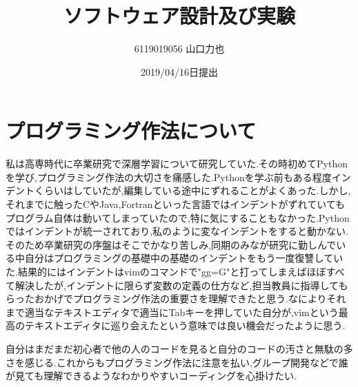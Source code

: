\documentclass{jarticle}
\title{ソフトウェア設計及び実験\\}
\author{6119019056 山口力也}
\date{2019/04/16日提出}
\begin{document}
\maketitle
\section{プログラミング作法について}
私は高専時代に卒業研究で深層学習について研究していた.その時初めてPythonを学び,プログラミング作法の大切さを痛感した.Pythonを学ぶ前もある程度インデントくらいはしていたが,編集している途中にずれることがよくあった.しかし,それまでに触ったCやJava,Fortranといった言語ではインデントがずれていてもプログラム自体は動いてしまっていたので,特に気にすることもなかった.Pythonではインデントが統一されており,私のように変なインデントをすると動かない.そのため卒業研究の序盤はそこでかなり苦しみ,同期のみなが研究に勤しんでいる中自分はプログラミングの基礎中の基礎のインデントをもう一度復讐していた.結果的にはインデントはvimのコマンドで"gg=G"と打ってしまえばほぼすべて解決したが,インデントに限らず変数の定義の仕方など,担当教員に指導してもらったおかげでプログラミング作法の重要さを理解できたと思う.なによりそれまで適当なテキストエディタで適当にTabキーを押していた自分が,vimという最高のテキストエディタに巡り会えたという意味では良い機会だったように思う.

自分はまだまだ初心者で他の人のコードを見ると自分のコードの汚さと無駄の多さを感じる.これからもプログラミング作法に注意を払い,グループ開発などで誰が見ても理解できるようなわかりやすいコーディングを心掛けたい.
\end{document}
